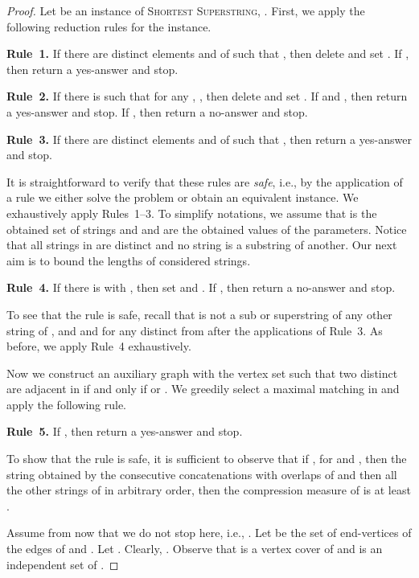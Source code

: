 \documentclass[11pt]{article}
\begin{document}
\begin{proof}
Let  be an instance of \textsc{Shortest Superstring}, . First, we apply the following reduction rules for the instance.

\medskip
\noindent
{\bf Rule~1.} If there are distinct elements  and  of  such that , then delete  and set . If , then return a yes-answer and stop.


\medskip
\noindent
{\bf Rule~2.} If there is  such that for any , , then delete  and set . 
If  and , then return a yes-answer and stop. If , then return a no-answer and stop.


\medskip
\noindent
{\bf Rule~3.} If there are distinct elements   and  of  such that , then return a yes-answer and stop. 

\medskip
It is straightforward to verify that these rules are \emph{safe}, i.e., by the application of a rule we either solve the problem or obtain an equivalent instance.
We exhaustively apply Rules~1--3. To simplify notations, we assume that  is the obtained set of strings and  and  are the obtained values of the parameters.
Notice that all strings in  are distinct and no string is a substring of another.
Our next aim is to bound the lengths of considered strings.

\medskip
\noindent
{\bf Rule~4.} If there is  with , then set  and . If , then return a no-answer and stop.

\medskip
To see that the rule is safe, recall that  is not a sub or superstring of any other string of , and  and  for any  distinct from  after the applications of Rule~3. As before, we apply Rule~4 exhaustively. 

Now we construct an auxiliary graph  with the vertex set  such that two distinct  are adjacent in  if and only if  or . 
We greedily select a maximal matching  in  and apply the following rule.

\medskip
\noindent
{\bf Rule~5.} If , then return a yes-answer and stop. 

\medskip
To show that the rule is safe, it is sufficient to observe that if ,  for  and , then the string  obtained by the consecutive concatenations with overlaps of    and then all the other strings of  in arbitrary order, then the compression measure of  is at least . 

Assume from now that we do not stop here, i.e., . Let  be the set of end-vertices of the edges of  and . Let . Clearly, . Observe that  is a vertex cover of  and  is an independent set of . 


\end{proof}
\end{document}
